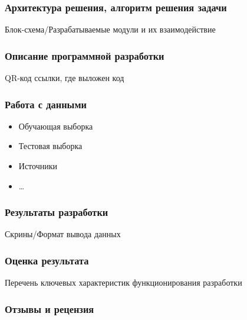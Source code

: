 \documentclass[pdf, hyperref={unicode}, aspectratio=169]{beamer}
\begin{document}
\begin{frame}
\frametitle{Архитектура решения, алгоритм решения задачи}

Блок-схема/Разрабатываемые модули и их взаимодействие
\end{frame}


\begin{frame}
\frametitle{Описание программной разработки}

QR-код ссылки, где выложен код
\end{frame}


\begin{frame}
\frametitle{Работа с данными}

\begin{itemize}
	\item Обучающая выборка
	\item Тестовая выборка
	\item Источники
	\item …
\end{itemize}
\end{frame}


\begin{frame}
\frametitle{Результаты разработки}

Скрины/Формат вывода данных
\end{frame}


\begin{frame}
\frametitle{Оценка результата}

Перечень ключевых характеристик функционирования разработки
\end{frame}


\begin{frame}
\frametitle{Отзывы и рецензия}

\begin{columns}

\end{columns}
\end{frame}
\end{document}

